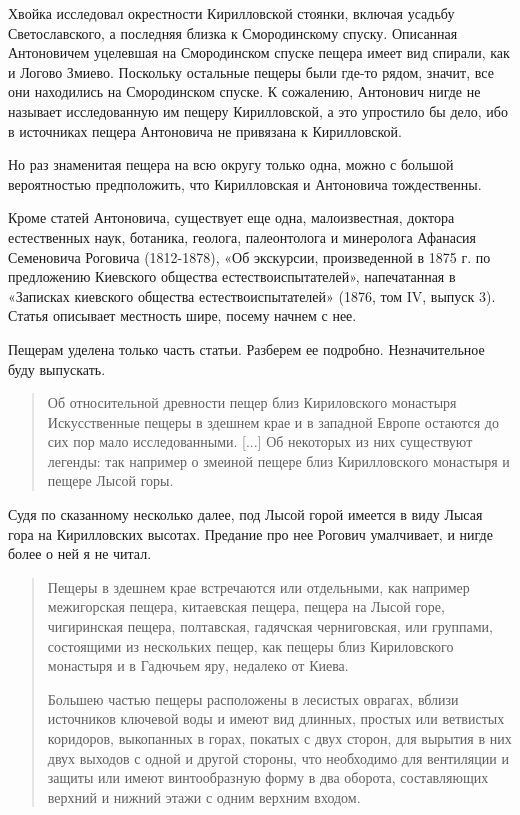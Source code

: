 Хвойка исследовал окрестности Кирилловской стоянки, включая усадьбу Светославского, а последняя близка к Смородинскому спуску. Описанная Антоновичем уцелевшая на Смородинском спуске пещера имеет вид спирали, как и Логово Змиево. Поскольку остальные пещеры были где-то рядом, значит, все они находились на Смородинском спуске. К сожалению, Антонович нигде не называет исследованную им пещеру Кирилловской, а это упростило бы дело, ибо в источниках пещера Антоновича не привязана к Кирилловской.

Но раз знаменитая пещера на всю округу только одна, можно с большой вероятностью предположить, что Кирилловская и Антоновича тождественны.

Кроме статей Антоновича, существует еще одна, малоизвестная, доктора естественных наук, ботаника, геолога, палеонтолога и минеролога Афанасия Семеновича Роговича (1812-1878), «Об экскурсии, произведенной в 1875 г. по предложению Киевского общества естествоиспытателей», напечатанная в «Записках киевского общества естествоиспытателей» (1876, том IV, выпуск 3). Статья описывает местность шире, посему начнем с нее. 

Пещерам уделена только часть статьи. Разберем ее подробно. Незначительное буду выпускать.

\begin{quotation}
Об относительной древности пещер близ Кириловского монастыря\\

Искусственные пещеры в здешнем крае и в западной Европе остаются до сих пор мало исследованными. [...] Об некоторых из них существуют легенды: так например о змеиной пещере близ Кирилловского монастыря и пещере Лысой горы.
\end{quotation}

Судя по сказанному несколько далее, под Лысой горой имеется в виду Лысая гора на Кирилловских высотах. Предание про нее Рогович умалчивает, и нигде более о ней я не читал.

\begin{quotation}
Пещеры в здешнем крае встречаются или отдельными, как например межигорская пещера, китаевская пещера, пещера на Лысой горе, чигиринская пещера, полтавская, гадячская черниговская, или группами, состоящими из нескольких пещер, как пещеры близ Кириловского монастыря и в Гадючьем яру, недалеко от Киева.

Большею частью пещеры расположены в лесистых оврагах, вблизи источников ключевой воды и имеют вид длинных, простых или ветвистых коридоров, выкопанных в горах, покатых с двух сторон, для вырытия в них двух выходов с одной и другой стороны, что необходимо для вентиляции и защиты или имеют винтообразную форму в два оборота, составляющих верхний и нижний этажи с одним верхним входом.
\end{quotation}

